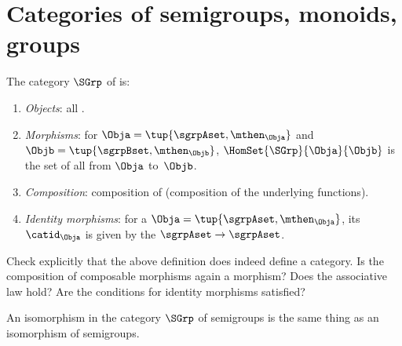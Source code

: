 
\section[Categories of semigroups, monoids, groups]{Categories of semigroups, monoids, groups}
\label{sec:cats-of-semigroups-monoids-groups}


\begin{ctdefinition}
    \label{def:SGrp}
    The category $\SGrp$ of  is:
    \begin{enumerate}
        \item \emph{Objects}: all .
        \item \emph{Morphisms}: for  $\Obja = \tup{\sgrpAset, \mthen_\Obja}$ and $\Objb = \tup{\sgrpBset, \mthen_\Objb}$,  $\HomSet{\SGrp}{\Obja}{\Objb}$ is the set of all  from $\Obja$ to~$\Objb$.
        \item \emph{Composition}: composition of  (composition of the underlying functions).
        \item \emph{Identity morphisms}: for a  $\Obja = \tup{\sgrpAset, \mthen_\Obja}$, its  $\catid_\Obja$ is given by the  $\sgrpAset \to \sgrpAset$.
    \end{enumerate}
\end{ctdefinition}

\begin{gradedexercise}
Check explicitly that the above definition does indeed define a category. Is the composition of composable morphisms again a morphism? Does the associative law hold? Are the conditions for identity morphisms satisfied? 
\end{gradedexercise}


\begin{remark}
An isomorphism in the category $\SGrp$ of semigroups is the same thing as an isomorphism of semigroups. 
\end{remark}




